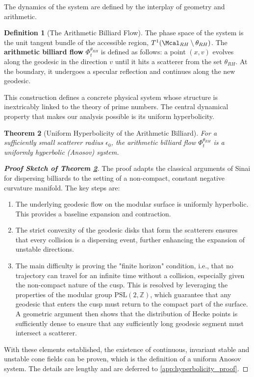 \documentclass[12pt, letterpaper]{amsart}
\theoremstyle{plain}
\newtheorem{theorem}{Theorem}[section]
\theoremstyle{definition}
\newtheorem{definition}[theorem]{Definition}
\theoremstyle{remark}
\newenvironment{proofsketch}[1]{\begin{proof}[\bf Proof Sketch of #1]}{\end{proof}}
\newcommand{\PSL}{\mathrm{PSL}}
\newcommand{\Z}{\mathbb{Z}}
\begin{document}
The dynamics of the system are defined by the interplay of geometry and arithmetic.

\begin{definition}[The Arithmetic Billiard Flow]
The phase space of the system is the unit tangent bundle of the accessible region, $T^1(\Mcal_{RH} \setminus \theta_{RH})$. The \textbf{arithmetic billiard flow} $\Phi_t^{\theta_{RH}}$ is defined as follows: a point $(x,v)$ evolves along the geodesic in the direction $v$ until it hits a scatterer from the set $\theta_{RH}$. At the boundary, it undergoes a specular reflection and continues along the new geodesic.
\end{definition}

This construction defines a concrete physical system whose structure is inextricably linked to the theory of prime numbers. The central dynamical property that makes our analysis possible is its uniform hyperbolicity.

\begin{theorem}[Uniform Hyperbolicity of the Arithmetic Billiard]
\label{thm:hyperbolicity_of_RH_billiard}
For a sufficiently small scatterer radius $\epsilon_0$, the arithmetic billiard flow $\Phi_t^{\theta_{RH}}$ is a uniformly hyperbolic (Anosov) system.
\end{theorem}

\begin{proofsketch}{Theorem \ref{thm:hyperbolicity_of_RH_billiard}}
The proof adapts the classical arguments of Sinai for dispersing billiards to the setting of a non-compact, constant negative curvature manifold. The key steps are:
\begin{enumerate}
    \item The underlying geodesic flow on the modular surface is uniformly hyperbolic. This provides a baseline expansion and contraction.
    \item The strict convexity of the geodesic disks that form the scatterers ensures that every collision is a dispersing event, further enhancing the expansion of unstable directions.
    \item The main difficulty is proving the "finite horizon" condition, i.e., that no trajectory can travel for an infinite time without a collision, especially given the non-compact nature of the cusp. This is resolved by leveraging the properties of the modular group $\PSL(2,\Z)$, which guarantee that any geodesic that enters the cusp must return to the compact part of the surface. A geometric argument then shows that the distribution of Hecke points is sufficiently dense to ensure that any sufficiently long geodesic segment must intersect a scatterer.
\end{enumerate}
With these elements established, the existence of continuous, invariant stable and unstable cone fields can be proven, which is the definition of a uniform Anosov system. The details are lengthy and are deferred to \cref{app:hyperbolicity_proof}.
\end{proofsketch}
\end{document}
